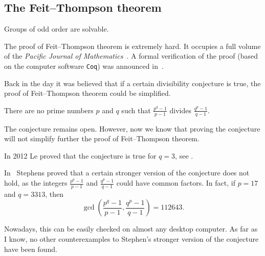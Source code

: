 

\subsection{The Feit--Thompson theorem}

\begin{theorem}
    Groups of odd order are solvable. 
\end{theorem}

The proof of Feit--Thompson theorem is extremely hard. 
It occupies a full volume of the 
\emph{Pacific Journal of Mathematics}~\cite{MR166261}. 
A formal verification of the proof 
(based on the computer software \lstinline{Coq}) 
was announced in~\cite{MR3111271}.  
\begin{optional}
    
Back in the day it was believed that if a certain divisibility 
conjecture is true, 
the proof of Feit--Thompson theorem 
could be simplified. 

\begin{conj}
    There are no prime numbers $p$ and $q$ such that
    $\frac {p^{q}-1}{p-1}$ divides $\frac{q^{p} - 1}{q - 1}$. 
\end{conj}

The conjecture remains open. However, now we know that 
proving the conjecture will not simplify further
the proof of Feit--Thompson theorem. 

In 2012 Le proved that the conjecture is true for $q=3$, see 
\cite{MR2900154}. 


In~\cite{MR297686} 
Stephens proved that a certain stronger version of the conjecture 
does not hold, as the integers 
$\frac {p^{q}-1}{p-1}$ and $\frac{q^{p} - 1}{q - 1}$ 
could have common factors. In fact, if $p=17$ and $q=3313$, 
then 
\[
\gcd\left(\frac {p^{q}-1}{p-1},\frac{q^{p} - 1}{q - 1}\right)=112643.
\]

Nowadays, this can be easily checked on almost any desktop computer. 
As far as I know, no other counterexamples to Stephen’s stronger version of the conjecture have been found.

\end{optional}



